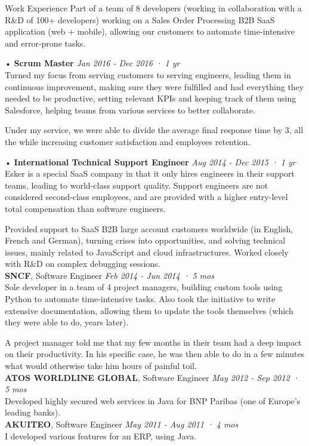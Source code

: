 \documentclass{resume} %
\begin{document}
\begin{rSection}{Work Experience}
Part of a team of 8 developers (working in collaboration with a R\&D of 100+ developers) working on a Sales Order Processing B2B SaaS application (web + mobile), allowing our customers to automate time-intensive and error-prone tasks.

• {\bf Scrum Master} \hfill {\em Jan 2016 - Dec 2016 · 1 yr}\\
Turned my focus from serving customers to serving engineers, leading them in continuous improvement, making sure they were fulfilled and had everything they needed to be productive, setting relevant KPIs and keeping track of them using Salesforce, helping teams from various services to better collaborate.

Under my service, we were able to divide the average final response time by 3, all the while increasing customer satisfaction and employees retention.

• {\bf International Technical Support Engineer} \hfill {\em Aug 2014 - Dec 2015 · 1 yr}\\
Esker is a special SaaS company in that it only hires engineers in their support teams, leading to world-class support quality. Support engineers are not considered second-class employees, and are provided with a higher entry-level total compensation than software engineers.

Provided support to SaaS B2B large account customers worldwide (in English, French and German), turning crises into opportunities, and solving technical issues, mainly related to JavaScript and cloud infrastructures. Worked closely with R\&D on complex debugging sessions.\\

{\bf SNCF}{, Software Engineer} \hfill {\em Feb 2014 - Jun 2014 · 5 mos}\\
Sole developer in a team of 4 project managers, building custom tools using Python to automate time-intensive tasks. Also took the initiative to write extensive documentation, allowing them to update the tools themselves (which they were able to do, years later).

A project manager told me that my few months in their team had a deep impact on their productivity. In his specific case, he was then able to do in a few minutes what would otherwise take him hours of painful toil.\\

{\bf ATOS WORLDLINE GLOBAL}{, Software Engineer} \hfill {\em May 2012 - Sep 2012 · 5 mos}\\
Developed highly secured web services in Java for BNP Paribas (one of Europe's leading banks).\\

{\bf AKUITEO}{, Software Engineer} \hfill {\em May 2011 - Aug 2011 · 4 mos}\\
I developed various features for an ERP, using Java.\\

\end{rSection}
\end{document}
